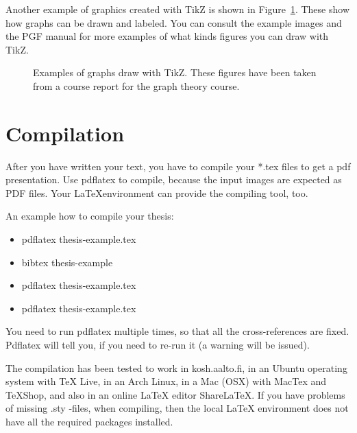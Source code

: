 Another example of graphics created with TikZ is shown in
Figure~\ref{fig:tikz-examples}. 
These show how graphs can be drawn and labeled. 
You can consult the example images and the PGF manual for more examples of what
kinds figures you can draw with TikZ. 

\newlength{\graphdotsize}
\setlength{\graphdotsize}{1.7pt}
\newlength{\graphgridsize}
\setlength{\graphgridsize}{1.2em}
\begin{figure}[ht]
\begin{center}
\caption{Examples of graphs draw with TikZ. These figures have been taken from a
course report for the graph theory course.}
\label{fig:tikz-examples}
\end{center}
\end{figure}

\section{Compilation}
\label{section:compilation}

After you have written your text, you have to compile your *.tex files to get 
a pdf presentation. Use pdflatex to compile, because the input images are expected 
as PDF files. Your \LaTeX environment can provide the compiling tool, too.

An example how to compile your thesis:
\begin{itemize}
	\setlength{\itemsep}{5pt}
	\item pdflatex thesis-example.tex
	\item bibtex thesis-example
	\item pdflatex thesis-example.tex
	\item pdflatex thesis-example.tex
\end{itemize}

You need to run pdflatex multiple times, so that all the cross-references
are fixed. Pdflatex will tell you, if you need to re-run it (a warning
will be issued).  

The compilation has been tested to work in kosh.aalto.fi, in an Ubuntu operating
system with TeX Live, in an Arch Linux, in a Mac (OSX) with MacTex and
TeXShop, and also in 
an online LaTeX editor ShareLaTeX. If you have problems of missing .sty -files, 
when compiling, then the local LaTeX environment does not have all the 
required packages installed.

